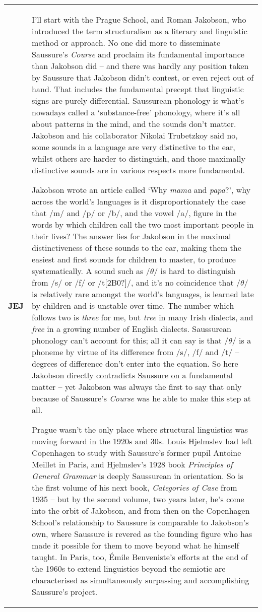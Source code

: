 \documentclass[12pt]{article}
\begin{document}
\begin{flushleft}
\begin{supertabular}{m{0.24415985in}m{5.89766in}}
\textbf{JEJ}\newline
 &
I’ll start with the Prague School, and Roman Jakobson, who introduced the term structuralism as a literary and linguistic method or approach. No one did more to disseminate Saussure’s \textit{Course} and proclaim its fundamental importance than Jakobson did – and there was hardly any position taken by Saussure that Jakobson didn’t contest, or even reject out of hand. That includes the fundamental precept that linguistic signs are purely differential. Saussurean phonology is what’s nowadays called a ‘substance-free’ phonology, where it’s all about patterns in the mind, and the sounds don’t matter. Jakobson and his collaborator Nikolai Trubetzkoy said no, some sounds in a language are very distinctive to the ear, whilst others are harder to distinguish, and those maximally distinctive sounds are in various respects more fundamental. 

Jakobson wrote an article called ‘Why \textit{mama} and \textit{papa}?’, why across the world’s languages is it disproportionately the case that /m/ and /p/ or /b/, and the vowel /a/, figure in the words by which children call the two most important people in their lives? The answer lies for Jakobson in the maximal distinctiveness of these sounds to the ear, making them the easiest and first sounds for children to master, to produce systematically. A sound such as /$\theta $/ is hard to distinguish from /s/ or /f/ or /t[2B0?]/, and it’s no coincidence that /$\theta $/ is relatively rare amongst the world’s languages, is learned late by children and is unstable over time. The number which follows two is \textit{three} for me, but \textit{tree} in many Irish dialects, and \textit{free} in a growing number of English dialects. Saussurean phonology can’t account for this; all it can say is that /$\theta $/ is a phoneme by virtue of its difference from /s/, /f/ and /t/ – degrees of difference don’t enter into the equation. So here Jakobson directly contradicts Saussure on a fundamental matter – yet Jakobson was always the first to say that only because of Saussure’s \textit{Course} was he able to make this step at all. 

Prague wasn’t the only place where structural linguistics was moving forward in the 1920s and 30s. Louis Hjelmslev had left Copenhagen to study with Saussure’s former pupil Antoine Meillet in Paris, and Hjelmslev’s 1928 book \textit{Principles of General Grammar} is deeply Saussurean in orientation. So is the first volume of his next book, \textit{Categories of Case} from 1935 – but by the second volume, two years later, he’s come into the orbit of Jakobson, and from then on the Copenhagen School’s relationship to Saussure is comparable to Jakobson’s own, where Saussure is revered as the founding figure who has made it possible for them to move beyond what he himself taught. In Paris, too, Émile Benveniste’s efforts at the end of the 1960s to extend linguistics beyond the semiotic are characterised as simultaneously surpassing and accomplishing Saussure’s project. 


\end{supertabular}
\end{flushleft}
\end{document}
